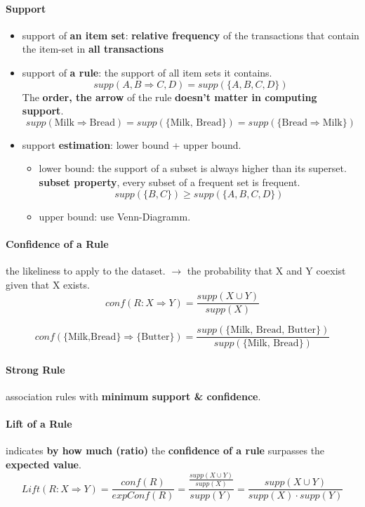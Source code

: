 \paragraph{Support}
\begin{itemize}
	\item support of \textbf{an item set}: \textbf{relative frequency} of the transactions that contain the item-set in \textbf{all transactions}
	\item support of \textbf{a rule}: the support of all item sets it contains. 
	$$supp(A,B \Rightarrow C,D) = supp(\{A,B,C,D\})$$
	The \textbf{order, the arrow} of the rule \textbf{doesn't matter in computing support}.
	$$supp(\text{Milk} \Rightarrow \text{Bread}) = supp(\{\text{Milk, Bread}\}) = supp(\{\text{Bread} \Rightarrow \text{Milk}\})$$
	
	\item support \textbf{estimation}: lower bound + upper bound. 
	\begin{itemize}
		\item lower bound: the support of a subset is always higher than its superset. \textbf{subset property}, every subset of a frequent set is frequent. 
		$$supp(\{B,C\}) \geq supp(\{A,B,C,D\})$$
		\item upper bound: use Venn-Diagramm.
	\end{itemize}
\end{itemize}

\paragraph{Confidence of a Rule} the likeliness to apply to the dataset. $\rightarrow$ the probability that X and Y coexist given that X exists.
$$conf(R: X \Rightarrow Y) = \frac{supp(X \cup Y)}{supp(X)}$$

$$conf(\{\text{Milk,Bread}\} \Rightarrow \{\text{Butter}\}) = \frac{supp(\{\text{Milk, Bread, Butter}\})}{supp(\{\text{Milk, Bread}\})}$$

\paragraph{Strong Rule} association rules with \textbf{minimum support \& confidence}.

\paragraph{Lift of a Rule} indicates \textbf{by how much (ratio)} the \textbf{confidence of a rule} surpasses the \textbf{expected value}. 
$$Lift(R: X \Rightarrow Y) = \frac{conf(R)}{expConf(R)} = \dfrac{\frac{supp(X \cup Y)}{supp(X)}}{supp(Y)} = \frac{supp(X \cup Y)}{supp(X)\cdot supp(Y)}$$

